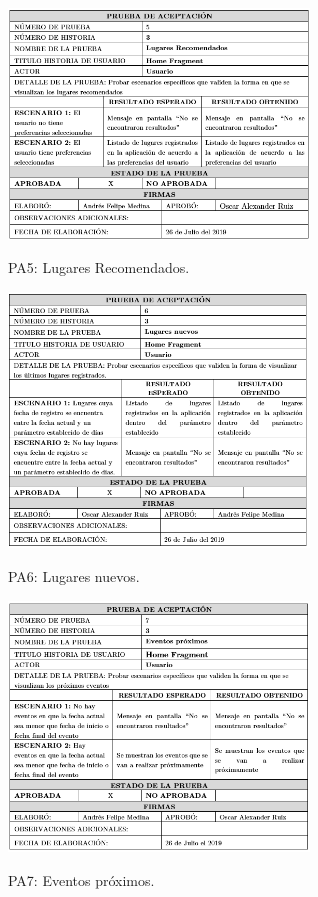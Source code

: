 \documentclass[12pt,letterpaper,openany]{book}
\begin{document}
\begin{table}[H]
\centering
\includegraphics[width=8cm]{./imagenes/PA/PA5}
\caption{PA5: Lugares Recomendados.}
\end{table}

\begin{table}[H]
\centering
\includegraphics[width=8cm]{./imagenes/PA/PA6}
\caption{PA6: Lugares nuevos.}
\end{table}

\begin{table}[H]
\centering
\includegraphics[width=8cm]{./imagenes/PA/PA7}
\caption{PA7: Eventos próximos.}
\end{table}
\end{document}
